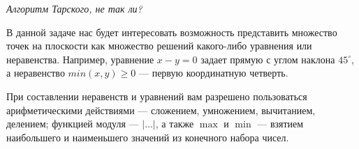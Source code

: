﻿

\begin{flushright} \itshape
	Алгоритм Тарского, не так ли?
\end{flushright}

\ms В данной задаче нас будет интересовать возможность представить множество точек на плоскости как множество решений какого-либо уравнения или неравенства. Например, уравнение $x - y = 0$ задает прямую с углом наклона $45^\circ$, а неравенство $min (x,y) \geq 0$ — первую координатную четверть.

\ms При составлении неравенств и уравнений вам разрешено пользоваться арифметическими действиями — сложением, умножением, вычитанием, делением; функцией модуля — $|\ldots|$, а также $\max$ и $\min$ — взятием наибольшего и наименьшего значений из конечного набора чисел.

